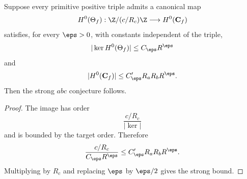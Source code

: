 \begin{theorem}
Suppose every primitive positive triple admits a canonical map
\[
 H^0(\Theta_f):\Z/(c/R_c)\Z\longrightarrow H^0(\mathbf C_f)
\]
satisfies, for every $\eps>0$, with constants independent of the triple,
\[
 |\ker H^0(\Theta_f)|\le C_\eps R^\eps
\]
and
\[
 |H^0(\mathbf C_f)|\le C'_\eps R_aR_bR^\eps.
\]
Then the strong $abc$ conjecture follows.
\end{theorem}

\begin{proof}
The image has order
\[
 \frac{c/R_c}{|\ker|}
\]
and is bounded by the target order. Therefore
\[
 \frac{c/R_c}{C_\eps R^\eps}
 \le
 C'_\eps R_aR_bR^\eps.
\]
Multiplying by $R_c$ and replacing $\eps$ by $\eps/2$ gives the strong bound.
\end{proof}

